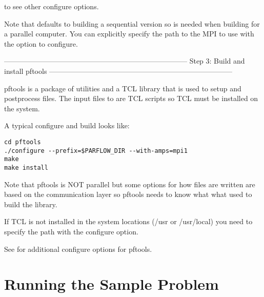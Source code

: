 \begin{enumerate}
to see other configure options.   

Note that \parflow{} defaults to building a sequential version so
 is needed when building for a parallel computer.  You
can explicitly specify the path to the MPI to use with the
 option to configure.

-----------------------------------------------------------------------------
Step 3: Build and install pftools
-----------------------------------------------------------------------------

pftools is a package of utilities and a TCL library that is used to
setup and postprocess \parflow{} files.  The input files to \parflow{} are
TCL scripts so TCL must be installed on the system.

A typical configure and build looks like:

\begin{display}\begin{verbatim}
cd pftools
./configure --prefix=$PARFLOW_DIR --with-amps=mpi1
make 
make install
\end{verbatim}\end{display}

Note that pftools is NOT parallel but some options for how files are
written are based on the communication layer so pftools needs to know
what what used to build the \parflow{} library.

If TCL is not installed in the system locations (/usr or /usr/local) you need
to specify the path with the  configure option.

See  for additional configure options for pftools.

\end{enumerate}


\section{Running the Sample Problem}
\label{Running the Sample Problem}

